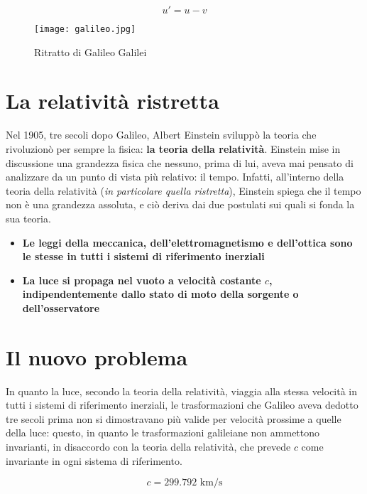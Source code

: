 \documentclass{article}
\begin{document}
\begin{equation}
    \label{velocità di Galileo}
    u' = u - v
\end{equation}

\begin{figure}[htbp] %
    \label{galileo}
    \centerline{\texttt{[image: galileo.jpg]}}
    \caption{Ritratto di Galileo Galilei}
\end{figure}

\section{La relatività ristretta}
Nel 1905, tre secoli dopo Galileo, Albert Einstein sviluppò la
teoria che rivoluzionò per sempre la fisica:
\textbf{la teoria della relatività}. Einstein mise in discussione
una grandezza fisica che nessuno, prima di lui, aveva mai pensato
di analizzare da un punto di vista più relativo: il tempo. Infatti,
all'interno della teoria della relatività (\textit{in particolare quella
ristretta}), Einstein spiega che il tempo non è una grandezza
assoluta, e ciò deriva dai due postulati sui quali si fonda
la sua teoria.

\begin{itemize}
    \item{\textbf{Le leggi della meccanica, dell'elettromagnetismo e
    dell'ottica sono le stesse in tutti i sistemi di riferimento inerziali}}
    \item{\textbf{La luce si propaga nel vuoto a velocità costante \(c\),
    indipendentemente dallo stato di moto della sorgente o dell'osservatore}}
\end{itemize}

\section{Il nuovo problema}
In quanto la luce, secondo la teoria della relatività, viaggia alla
stessa velocità in tutti i sistemi di riferimento inerziali,
le trasformazioni che Galileo aveva dedotto tre secoli prima non si
dimostravano più valide per velocità prossime a quelle della luce:
questo, in quanto le trasformazioni galileiane non ammettono invarianti,
in disaccordo con la teoria della relatività, che prevede \(c\) come
invariante in ogni sistema di riferimento.

\begin{equation}
    \label{velocità della luce}
    c = 299.792 \textrm{\ km/s}
\end{equation}
\end{document}
